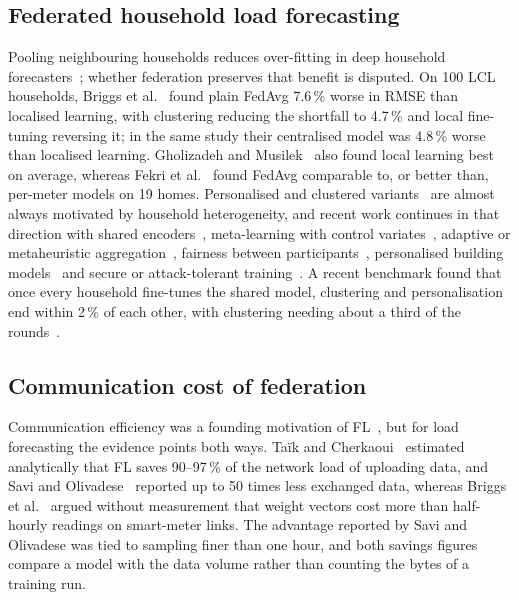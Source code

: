 \subsection{Federated household load forecasting}
Pooling neighbouring households reduces over-fitting in deep household forecasters~\cite{shi2018pdrnn}; whether
federation preserves that benefit is disputed. On 100 LCL
households, Briggs et al.~\cite{briggs2022} found plain FedAvg 7.6\,\% worse in RMSE than localised learning, with
clustering reducing the shortfall to 4.7\,\% and local fine-tuning reversing it; in the same study their centralised
model was 4.8\,\% worse than localised learning. Gholizadeh and Musilek~\cite{gholizadeh2022} also found local
learning best on average, whereas Fekri et al.~\cite{fekri2022} found FedAvg comparable to, or better than, per-meter
models on 19 homes. Personalised and clustered variants~\cite{qu2023,widmer2023,dogra2023,das2026,lu2024fds} are almost
always motivated by household heterogeneity, and recent work continues in that direction with shared encoders~\cite{zhu2025pfholo},
meta-learning with control variates~\cite{feng2025fmaml}, adaptive or metaheuristic
aggregation~\cite{abdulla2024,sarantinopoulos2025}, fairness between participants~\cite{wang2025mgdflp}, personalised
building models~\cite{wang2024pflbuildings,dissem2025} and secure or attack-tolerant training~\cite{husnoo2024,mostafanezhad2025}.
A recent benchmark found that once every household fine-tunes the shared model, clustering and personalisation end within
2\,\% of each other, with clustering needing about a third of the rounds~\cite{zheng2026benchmark}.

\subsection{Communication cost of federation}
Communication efficiency was a founding motivation of FL~\cite{mcmahan2017fedavg,konecny2016comm}, but for load
forecasting the evidence points both ways. Taïk and Cherkaoui~\cite{taik2020} estimated analytically that FL saves
90--97\,\% of the network load of uploading data, and Savi and Olivadese~\cite{savi2021} reported up to 50 times less
exchanged data, whereas Briggs et al.~\cite{briggs2020ccai} argued without measurement that weight vectors cost more
than half-hourly readings on smart-meter links. The advantage reported by Savi and Olivadese was tied to sampling finer
than one hour, and both savings figures compare a model with the data volume rather than counting the bytes of a
training run.

